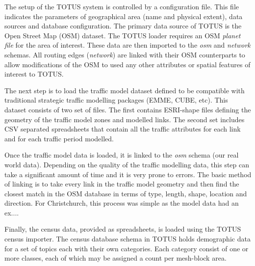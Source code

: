 The setup of the TOTUS system is controlled by a configuration file. This file indicates the parameters of geographical area (name and physical extent), data sources and database configuration.
The primary data source of TOTUS is the Open Street Map (OSM) dataset. The TOTUS loader requires an OSM \textit{planet file} for the area of interest. These data are then imported to the \textit{osm}  and \textit{network} schemas.  All routing edges (\textit{network}) are linked with their OSM counterparts to allow modifications of the OSM to used any other attributes or spatial features of interest to TOTUS.

The next step is to load the traffic model dataset defined to be compatible with traditional strategic traffic modelling packages (EMME, CUBE, etc). This dataset consists of two set of files. The first contains ESRI-shape files defining the geometry of the traffic model zones and modelled links. The second set includes CSV separated spreadsheets that contain all the traffic attributes for each link and for each traffic period modelled.

Once the traffic model data is loaded, it is linked to the \textit{osm} schema (our real world data). Depending on the quality of the traffic modelling data, this step can take a significant amount of time and it is very prone to errors. The basic method of linking is to take every link in the traffic model geometry and then find the closest match in the OSM database in terms of type, length, shape, location and direction. For Christchurch, this process was simple as the model data had an ex....

Finally, the census data, provided as spreadsheets, is loaded using the TOTUS census importer. The census
database schema in TOTUS holds demographic data for a set of topics
each with their own categories. Each category consist of one or more
classes, each of which may be assigned a count per mesh-block area.

